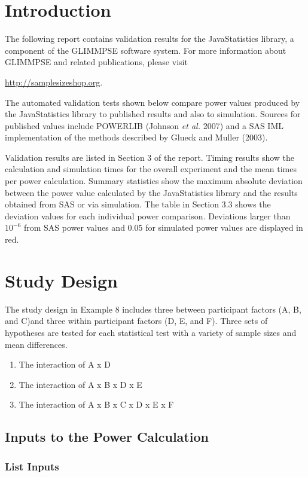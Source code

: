 \documentclass{glimmpse-report}
\begin{document}
\section{Introduction}
The following report contains validation results for the JavaStatistics library, a component of the GLIMMPSE software system.  For more information about GLIMMPSE and related publications, please visit

 

\href{http://samplesizeshop.org}{http://samplesizeshop.org}.

The automated validation tests shown below compare power values produced by the JavaStatistics library to published results and also to simulation.  Sources for published values include POWERLIB (Johnson \emph{et al.} 2007) and a SAS IML implementation of the methods described by Glueck and Muller (2003).

Validation results are listed in Section 3 of the report.  Timing results show the calculation and simulation times for the overall experiment and the mean times per power calculation.  Summary statistics show the maximum absolute deviation between the power value calculated by the JavaStatistics library and the results obtained from SAS or via simulation.  The table in Section 3.3 shows the deviation values for each individual power comparison.  Deviations larger than $10^{-6}$ from SAS power values and $0.05$ for simulated power values are displayed in red.

 \section{Study Design}
The study design in Example 8 includes three between participant factors (A, B, and C)and three within participant factors (D, E, and F).  Three sets of hypotheses are tested for each statistical test with a variety of sample sizes and mean differences. 
\begin{enumerate}\item The interaction of A x D 
\item The interaction of A x B x D x E
\item The interaction of A x B x C x D x E x F\end{enumerate}


\subsection{Inputs to the Power Calculation}
\subsubsection{List Inputs}
\end{document}
